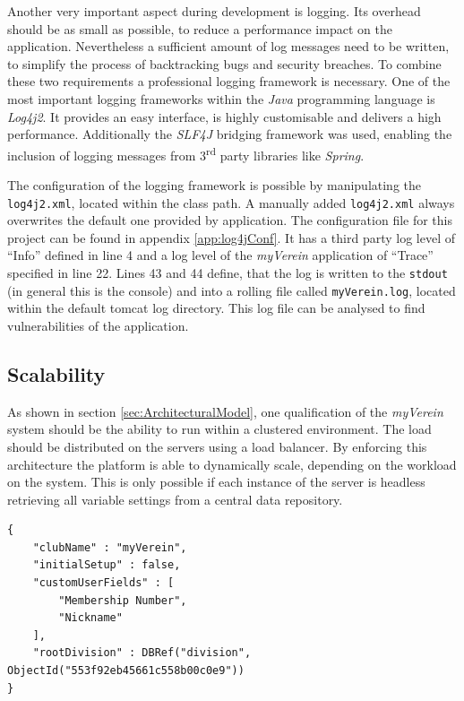 Another very important aspect during development is logging. Its overhead should be as small as possible, to reduce a performance impact on the application. Nevertheless a sufficient amount of log messages need to be written, to simplify the process of backtracking bugs and security breaches. To combine these two requirements a professional logging framework is necessary. One of the most important logging frameworks within the \emph{Java} programming language is \emph{Log4j2}. It provides an easy interface, is highly customisable and delivers a high performance. Additionally the \emph{SLF4J} bridging framework was used, enabling the inclusion of logging messages from 3\textsuperscript{rd} party libraries like \emph{Spring}.

The configuration of the logging framework is possible by manipulating the \texttt{log4j2.xml}, located within the class path. A manually added \texttt{log4j2.xml} always overwrites the default one provided by application. The configuration file for this project can be found in appendix \vref{app:log4jConf}. It has a third party log level of \enquote{Info} defined in line 4 and a log level of the \emph{myVerein} application of \enquote{Trace} specified in line 22. Lines 43 and 44 define, that the log is written to the \texttt{stdout} (in general this is the console) and into a rolling file called \texttt{myVerein.log}, located within the default tomcat log directory. This log file can be analysed to find vulnerabilities of the application.

\subsection{Scalability}
\label{sec:Scalability}

As shown in section \vref{sec:ArchitecturalModel}, one qualification of the \emph{myVerein} system should be the ability to run within a clustered environment. The load should be distributed on the servers using a load balancer. By enforcing this architecture the platform is able to dynamically scale, depending on the workload on the system. This is only possible if each instance of the server is headless retrieving all variable settings from a central data repository. 

\begin{lstlisting}[caption ={Example layout of settings document}, label=lst:SettingsDoc]
{
	"clubName" : "myVerein", 
	"initialSetup" : false, 
	"customUserFields" : [
		"Membership Number",
		"Nickname"
	],
	"rootDivision" : DBRef("division", ObjectId("553f92eb45661c558b00c0e9")) 
}
\end{lstlisting}

